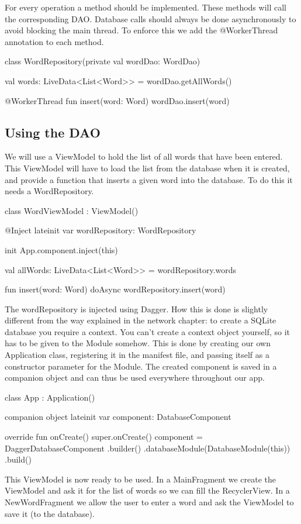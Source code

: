 For every operation a method should be implemented. 
These methods will call the corresponding DAO.
Database calls should always be done asynchronously to avoid blocking the main thread.
To enforce this we add the @WorkerThread annotation to each method.

\begin{android}
class WordRepository(private val wordDao: WordDao) {
	val words: LiveData<List<Word>> = wordDao.getAllWords()
	
	@WorkerThread
	fun insert(word: Word) {
		wordDao.insert(word)
	}
}
\end{android}


\subsection{Using the DAO}
We will use a ViewModel to hold the list of all words that have been entered.
This ViewModel will have to load the list from the database when it is created, and provide a function that inserts a given word into the database.
To do this it needs a WordRepository.

\begin{android}
class WordViewModel : ViewModel() {
	@Inject
	lateinit var wordRepository: WordRepository
	
	init {
		App.component.inject(this)
	}
	
	val allWords: LiveData<List<Word>> = wordRepository.words
	
	fun insert(word: Word) {
		doAsync {
			wordRepository.insert(word)
		}
	}
}
\end{android}

The wordRepository is injected using Dagger. 
How this is done is slightly different from the way explained in the network chapter:
to create a SQLite database you require a context. 
You can't create a context object yourself, so it has to be given to the Module somehow. 
This is done by creating our own Application class, registering it in the manifest file, and passing itself as a constructor parameter for the Module.
The created component is saved in a companion object and can thus be used everywhere throughout our app.

\begin{android}	
class App : Application() {
	companion object {
		lateinit var component: DatabaseComponent
	}
	
	override fun onCreate() {
		super.onCreate()
		component = DaggerDatabaseComponent
						.builder()
						.databaseModule(DatabaseModule(this))
						.build()
	}
}
\end{android}

This ViewModel is now ready to be used.
In a MainFragment we create the ViewModel and ask it for the list of words so we can fill the RecyclerView.
In a NewWordFragment we allow the user to enter a word and ask the ViewModel to save it (to the database).
